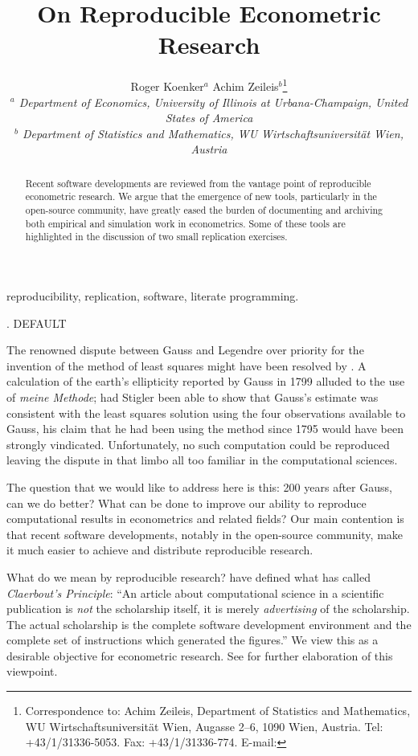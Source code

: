 \documentclass[10pt,a4paper,twoside]{article}
\title{\bf On Reproducible Econometric Research}
\author{\hfill Roger Koenker$^a$ \hfill Achim Zeileis$^b$\thanks{Correspondence
to: Achim Zeileis, Department of Statistics and Mathematics, WU Wirtschaftsuniversit\"at Wien,
Augasse 2--6, 1090 Wien, Austria. Tel: +43/1/31336-5053. Fax: +43/1/31336-774.
E-mail: \email{Achim.Zeileis@R-project.org}} \hfill \hfill \\
{\small \it $^a$ Department of Economics, University of Illinois at Urbana-Champaign, United States of America} \\
{\small \it $^b$ Department of Statistics and Mathematics, WU Wirtschaftsuniversit\"at Wien, Austria}}
\date{}
\renewcommand{\section}{\secdef \mysec \mysecnn}
\newcommand{\mysec}[2][default]{\vspace{1.7\baselineskip}%
  \pdfbookmark[1]{#1}{Section.#1}%
  \refstepcounter{section}%
  \centerline{\large \thesection. \uppercase{#1}} \vspace{.5\baselineskip}}
\newcommand{\mysecnn}[1]{\vspace{1.7\baselineskip}%
  \centerline{\large #1} \vspace{.5\baselineskip}}
\begin{document}
\maketitle

\begin{abstract}
Recent software developments are reviewed from the vantage point of reproducible
econometric research.  We argue that the emergence of new tools, particularly in
the open-source community, have greatly eased the burden of documenting and archiving
both empirical and simulation work in econometrics.  Some of these tools are highlighted
in the discussion of two small replication exercises.
\end{abstract}

 reproducibility, replication, software,
  literate programming.




\section{Introduction} \label{sec:intro}

The renowned dispute between Gauss and Legendre over priority for the
invention of the method of least squares might have been resolved by
\cite{repro:Stigler:1981}.  A calculation of the earth's ellipticity
reported by Gauss in 1799 alluded to the use of {\it meine Methode};
had Stigler been able to show that Gauss's estimate  was consistent
with the least squares solution using the four observations available
to Gauss, his claim that he had been using the method since 1795 would
have been strongly vindicated.  Unfortunately, no such computation
could be reproduced leaving the dispute in that limbo all too familiar
in the computational sciences.  

The question that we would like to address here is this:  200
years after Gauss, can we do better?  What can be done to
improve our ability to reproduce computational results in econometrics
and related fields?  Our main contention is that recent software developments, 
notably in the open-source community, make it much easier to achieve 
and distribute reproducible research.  

What do we mean by reproducible
research?  \cite{repro:Buckheit+Donoho:1995} have defined what
\cite{repro:deLeeuw:2001} has called \emph{Claerbout's Principle}:
``An article about computational science in a scientific publication
is \emph{not} the scholarship itself, it is merely \emph{advertising}
of the scholarship. The actual scholarship is the complete software
development environment and the complete set of instructions which
generated the figures.''  We view this as a desirable objective for
econometric research.  See \cite{repro:Schwab+Karrenbach+Claerbout:2000} 
for further elaboration of this viewpoint. 
\end{document}
